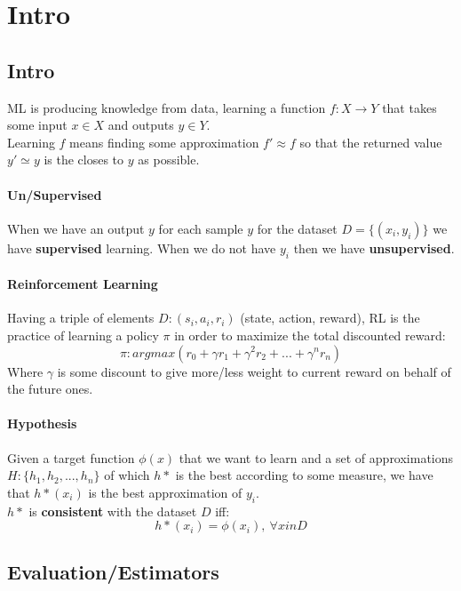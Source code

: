 
\newcommand{\braces}[1]{\lbrace{#1}\rbrace}


\section{Intro}
\subsection{Intro}
ML is producing knowledge from data, learning a function $f:X\rightarrow Y$ that takes some input $x \in X$ and outputs $y \in Y$.\\
Learning $f$ means finding some approximation $f' \approx f$ so that the returned value $y' \simeq y$ is the closes to $y$ as possible.\\

\paragraph{Un/Supervised}  When we have an output $y$ for each sample $y$ for the dataset $D=\lbrace (x_i,y_i)\rbrace$ we have \textbf{supervised } learning. When we do not have $y_i$ then we have \textbf{unsupervised}.

\paragraph{Reinforcement Learning}
Having a triple of elements $D: (s_i,a_i,r_i)$ (state, action, reward), RL is the practice of learning a policy $\pi$ in order to maximize the total discounted reward:
\[\pi: argmax(r_0+ \gamma r_1+ \gamma^2 r_2+...+\gamma^n r_n)\]
Where $\gamma$ is some discount to give more/less weight to current reward on behalf of the future ones.

\paragraph{Hypothesis}
Given a target function $\phi(x)$ that we want to learn and a set of approximations $H:\lbrace h_1, h_2,...,h_n\rbrace$ of which $h*$ is the best according to some measure, we have that $h*(x_i)$ is the best approximation of $y_i$.\\
$h*$ is \textbf{consistent} with the dataset $D$ iff:
\[h*(x_i)= \phi(x_i),\ \forall x in D\]

\subsection{Evaluation/Estimators}

